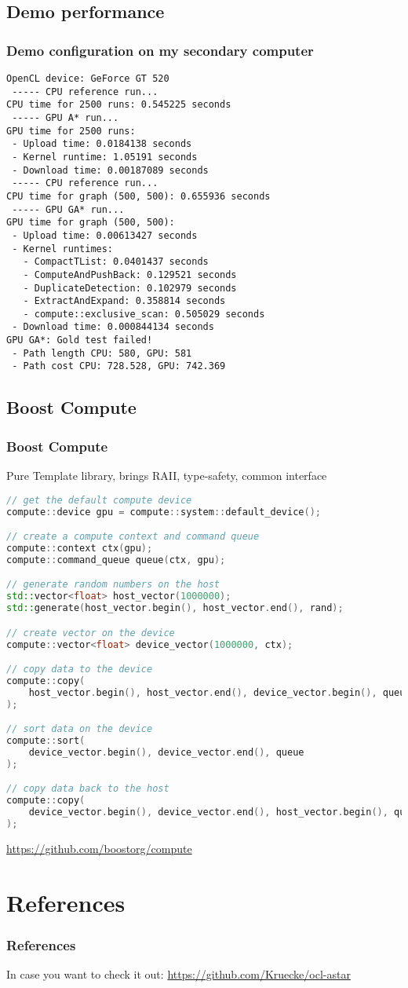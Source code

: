 \documentclass{beamer}
\begin{document}
\subsection{Demo performance}
\begin{frame}[fragile]
    \frametitle{Demo configuration on my secondary computer}
    \scriptsize
    \begin{verbatim}
OpenCL device: GeForce GT 520
 ----- CPU reference run...
CPU time for 2500 runs: 0.545225 seconds
 ----- GPU A* run...
GPU time for 2500 runs:
 - Upload time: 0.0184138 seconds
 - Kernel runtime: 1.05191 seconds
 - Download time: 0.00187089 seconds
 ----- CPU reference run...
CPU time for graph (500, 500): 0.655936 seconds
 ----- GPU GA* run...
GPU time for graph (500, 500):
 - Upload time: 0.00613427 seconds
 - Kernel runtimes: 
   - CompactTList: 0.0401437 seconds
   - ComputeAndPushBack: 0.129521 seconds
   - DuplicateDetection: 0.102979 seconds
   - ExtractAndExpand: 0.358814 seconds
   - compute::exclusive_scan: 0.505029 seconds
 - Download time: 0.000844134 seconds
GPU GA*: Gold test failed!
 - Path length CPU: 580, GPU: 581
 - Path cost CPU: 728.528, GPU: 742.369
    \end{verbatim}
\end{frame}

\subsection{Boost Compute}
\begin{frame}[fragile]
    \frametitle{Boost Compute}
Pure Template library, brings RAII, type-safety, common interface
    \begin{lstlisting}[language=C++,basicstyle=\tiny]
// get the default compute device
compute::device gpu = compute::system::default_device();

// create a compute context and command queue
compute::context ctx(gpu);
compute::command_queue queue(ctx, gpu);

// generate random numbers on the host
std::vector<float> host_vector(1000000);
std::generate(host_vector.begin(), host_vector.end(), rand);

// create vector on the device
compute::vector<float> device_vector(1000000, ctx);

// copy data to the device
compute::copy(
    host_vector.begin(), host_vector.end(), device_vector.begin(), queue
);

// sort data on the device
compute::sort(
    device_vector.begin(), device_vector.end(), queue
);

// copy data back to the host
compute::copy(
    device_vector.begin(), device_vector.end(), host_vector.begin(), queue
);
    \end{lstlisting}
    \url{https://github.com/boostorg/compute}
\end{frame}

\section*{References}
\begin{frame}
    \frametitle{References}
    
    \vspace{1em}
    In case you want to check it out: \url{https://github.com/Kruecke/ocl-astar}
\end{frame}
\end{document}
